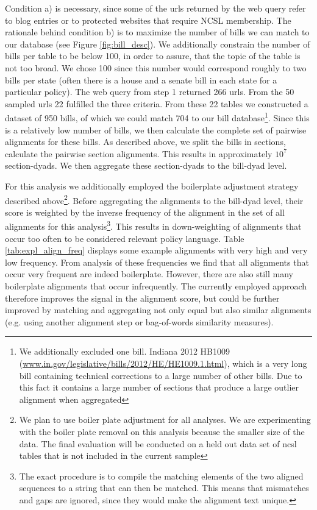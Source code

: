 \documentclass[12pt]{article} %
\begin{document}
Condition a) is necessary, since some of the urls returned by the web query refer to blog entries or to protected websites that require NCSL membership. The rationale behind condition b) is to maximize the number of bills we can match to our database (see Figure \ref{fig:bill_desc}). We additionally constrain the number of bills per table to be below 100, in order to assure, that the topic of the table is not too broad. We chose 100 since this number would correspond roughly to two bills per state (often there is a house and a senate bill in each state for a particular policy).
The web query from step 1 returned 266 urls. From the 50 sampled urls 22
fulfilled the three criteria. From these 22 tables we constructed a dataset of
950 bills, of which we could match 704 to our bill database\footnote{We
    additionally excluded one bill. Indiana 2012 HB1009
    (\url{www.in.gov/legislative/bills/2012/HE/HE1009.1.html}), which is a
    very long bill containing technical corrections to a large number of
    other bills. Due to this fact it contains a large number of sections that
produce a large outlier alignment when aggregated}. Since this is a
relatively low number of bills, we then calculate the complete set of pairwise
alignments for these bills. As described above, we split the
bills in sections, calculate the pairwise section alignments. This results in
approximately $10^7$ section-dyads. We then aggregate these section-dyads to the
bill-dyad level. 

For this analysis we additionally employed the boilerplate adjustment strategy
described above\footnote{We plan to use boiler plate adjustment for all
    analyses. We are experimenting with the boiler plate removal on this
    analysis because the smaller size of the data. The final evaluation will be
    conducted on a held out data set of ncsl tables that is not included in the
current sample}. Before aggregating the alignments to the bill-dyad level, their
score is weighted by the inverse frequency of the alignment in the set of all
alignments for this analysis\footnote{The exact procedure is to compile the
matching elements of the two aligned sequences to a string that can then be
matched. This means that mismatches and gaps are ignored, since they would make
the alignment text unique.}. This results in down-weighting of alignments that occur too often to
be considered relevant policy language. Table
\ref{tab:expl_align_freq} displays some example alignments with very high and
very low frequency. From analysis of these frequencies we find that all alignments
that occur very frequent are indeed boilerplate. However, there are also still
many boilerplate alignments that occur infrequently. The currently employed
approach therefore improves the signal in the alignment score, but could be
further improved by matching and aggregating not only equal but also similar alignments (e.g. using another alignment
step or bag-of-words similarity measures).
\end{document}
